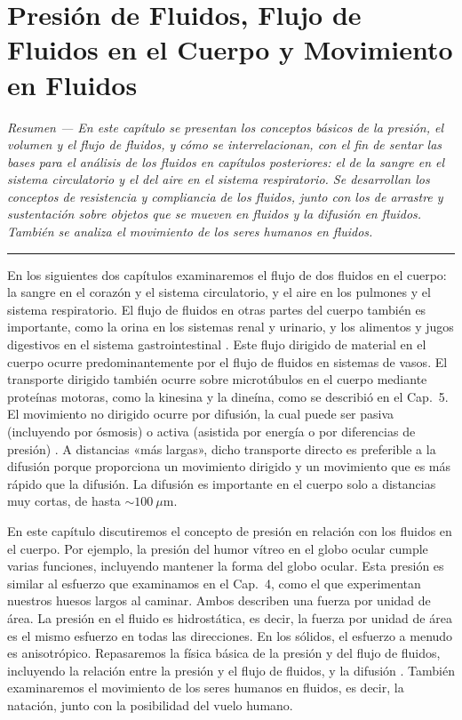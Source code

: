 \documentclass[12pt]{book}
\begin{document}
\setcounter{chapter}{6}

\chapter[Presión y Flujo de Fluidos]{Presión de Fluidos, Flujo de Fluidos en el Cuerpo y Movimiento en Fluidos}

\begin{flushleft}
    \textit{Resumen --- En este capítulo se presentan los conceptos básicos de la presión, el volumen y el flujo de fluidos, y cómo se interrelacionan, con el fin de sentar las bases para el análisis de los fluidos en capítulos posteriores: el de la sangre en el sistema circulatorio y el del aire en el sistema respiratorio. Se desarrollan los conceptos de resistencia y compliancia de los fluidos, junto con los de arrastre y sustentación sobre objetos que se mueven en fluidos y la difusión en fluidos. También se analiza el movimiento de los seres humanos en fluidos.}
\end{flushleft}

\hrule
\vspace{1em}

En los siguientes dos capítulos examinaremos el flujo de dos fluidos en el cuerpo: la sangre en el corazón y el sistema circulatorio, y el aire en los pulmones y el sistema respiratorio. El flujo de fluidos en otras partes del cuerpo también es importante, como la orina en los sistemas renal y urinario, y los alimentos y jugos digestivos en el sistema gastrointestinal \cite{20,23,28}. Este flujo dirigido de material en el cuerpo ocurre predominantemente por el flujo de fluidos en sistemas de vasos. El transporte dirigido también ocurre sobre microtúbulos en el cuerpo mediante proteínas motoras, como la kinesina y la dineína, como se describió en el Cap.~5. El movimiento no dirigido ocurre por difusión, la cual puede ser pasiva (incluyendo por ósmosis) o activa (asistida por energía o por diferencias de presión) \cite{28}. A distancias «más largas», dicho transporte directo es preferible a la difusión porque proporciona un movimiento dirigido y un movimiento que es más rápido que la difusión. La difusión es importante en el cuerpo solo a distancias muy cortas, de hasta ${\sim}100\ \mu\text{m}$.

En este capítulo discutiremos el concepto de presión en relación con los fluidos en el cuerpo. Por ejemplo, la presión del humor vítreo en el globo ocular cumple varias funciones, incluyendo mantener la forma del globo ocular. Esta presión es similar al esfuerzo que examinamos en el Cap.~4, como el que experimentan nuestros huesos largos al caminar. Ambos describen una fuerza por unidad de área. La presión en el fluido es hidrostática, es decir, la fuerza por unidad de área es el mismo esfuerzo en todas las direcciones. En los sólidos, el esfuerzo a menudo es anisotrópico. Repasaremos la física básica de la presión y del flujo de fluidos, incluyendo la relación entre la presión y el flujo de fluidos, y la difusión \cite{11,20,23,28}. También examinaremos el movimiento de los seres humanos en fluidos, es decir, la natación, junto con la posibilidad del vuelo humano.
\end{document}
